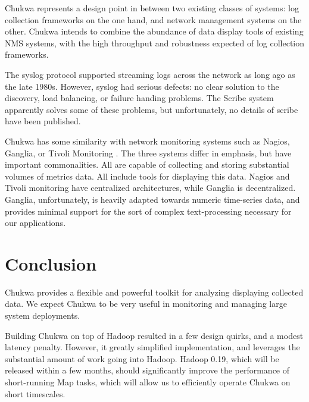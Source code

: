 \documentclass[letterpaper,twocolumn,10pt]{article}
\begin{document}
Chukwa represents a design point in between two existing classes of systems: log collection frameworks on the one hand, and network management systems on the other.  Chukwa intends to combine the abundance of data display tools of existing NMS systems, with the high throughput and robustness expected of log collection frameworks.

The syslog protocol supported streaming logs across the network as long ago as the late 1980s.  However, syslog had serious defects: no clear solution to the discovery, load balancing, or failure handing problems.  The Scribe system apparently solves some of these problems, but unfortunately, no details of scribe have been published.

Chukwa has some similarity with network monitoring systems such as Nagios, Ganglia, or Tivoli Monitoring \cite{Ganglia, Nagios, tivmon}. The three systems differ in emphasis, but have important commonalities.  All are capable of collecting and storing substantial volumes of metrics data. All include tools for displaying this data.  Nagios and Tivoli monitoring have centralized architectures, while Ganglia is decentralized.  Ganglia, unfortunately, is heavily adapted towards numeric time-series data, and provides minimal support for the sort of complex text-processing necessary for our applications.

\section{Conclusion}

Chukwa provides a flexible and powerful toolkit for analyzing displaying collected data.  We expect Chukwa to be very useful in monitoring and managing large system deployments.

Building Chukwa on top of Hadoop resulted in a few design quirks, and a modest latency penalty.  However, it greatly simplified implementation, and leverages the substantial amount of work going into Hadoop.  Hadoop 0.19, which will be released within a few months, should significantly improve the performance of short-running Map tasks, which will allow us to efficiently operate Chukwa on short timescales.


\end{document}

